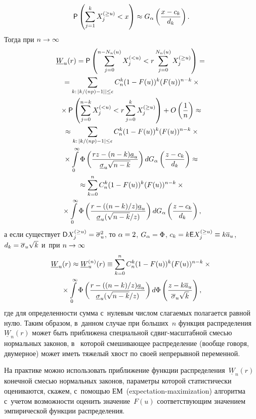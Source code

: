 \begin{multicols}{2}
\columnbreak

 \noindent
$$
{\sf P}\left(\sum\limits_{j=1}^{k}X_j^{(\ge u)}<x\right)
\approx G_{\alpha}\left(\displaystyle\frac{\displaystyle x-c_k\mathstrut}{\displaystyle d_k\mathstrut}\right).
$$
Тогда при $n\hm\to\infty$
\begin{multline}
\underline{W}_u(r)={\sf P}\left(\sum\limits_{j=0}^{n-N_n(u)}
X_j^{(<u)}<r\sum\limits_{j=0}^{N_n(u)}X_j^{(\ge u)}\right)={}
\\
{}=\sum\limits_{k:\,\left\vert
{k}/({np})-1\right\vert |\le\epsilon}
C_n^k(1-F(u))^k(F(u))^{n-k}\times{}\\
{}\times{\sf P}\left(
\sum\limits_{j=0}^{n-k}X_j^{(<u)}<r\sum\limits_{j=0}^{k}X_j^{(\ge u)}\right)+
O\left(\displaystyle\frac{\displaystyle 1\mathstrut}{\displaystyle n\mathstrut}\right)\approx{}
\\
{}\approx\sum\limits_{k:\,\left\vert {k}/({np})-1\right\vert
\le\epsilon} C_n^k(1-F(u))^k(F(u))^{n-k}\times{}\\
{}\times \int\limits_{0}^{\infty}
\Phi\left(\displaystyle\frac{\displaystyle rz-(n-k)\underline{a}_u\mathstrut}{\displaystyle \underline{\sigma}_u\sqrt{n-k}\mathstrut}\right)dG_{\alpha}
\left(\displaystyle\frac{\displaystyle z-c_k\mathstrut}{\displaystyle d_k\mathstrut}\right)\approx{}
\\
{}\approx\sum\limits_{k=0}^nC_n^k(1-F(u))^k(F(u))^{n-k}\times{}\\
{}\times
\int\limits_{0}^{\infty}\Phi\left(\displaystyle\frac{\displaystyle r-(({n-k})/{z}) \underline{a}_u\mathstrut}{\displaystyle \underline{\sigma}_u ({\sqrt{n-k}}/{z})\mathstrut}\right)dG_{\alpha}
\left(\displaystyle\frac{\displaystyle z-c_k\mathstrut}{\displaystyle d_k\mathstrut}\right),
\label{e6-kor}
\end{multline}
а если существует ${\sf D}X_j^{(\ge u)}\hm=\overline{\sigma}^2_u$, 
то $\alpha\hm=2$, $G_{\alpha}\hm=\Phi$, $c_k\hm=
k{\sf E}X_j^{(\ge u)}\hm\equiv k\overline{a}_u$, $d_k\hm=
\overline{\sigma}_u\sqrt{k}$ и~при $n\hm\to\infty$
\begin{multline}
\underline{W}_u(r)\approx \underline{W}_u^{(n)}(r)\equiv
\sum\limits_{k=0}^nC_n^k(1-F(u))^k(F(u))^{n-k}\times{}\\
{}\times \int\limits_{0}^{\infty}
\Phi\left(\displaystyle\frac{\displaystyle r-(({n-k})/{z})\underline{a}_u\mathstrut}{\displaystyle \underline{\sigma}_u ({\sqrt{n-k}}/{z})\mathstrut}\right)d\Phi
\left(\displaystyle\frac{\displaystyle z-k\overline{a}_u\mathstrut}{\displaystyle \overline{\sigma}_u\sqrt{k}\mathstrut}\right),
\label{e7-kor}
\end{multline}
где для определенности сумма с~нулевым числом слагаемых полагается 
равной нулю. Таким образом, в~данном случае при больших~$n$ 
функция распределения~$\underline{W}_n(r)$ может быть приближена 
специальной сдвиг-мас\-штаб\-ной смесью нормальных законов, в~ ко\-то\-рой 
смешивающее распределение (вообще говоря, двумерное) может иметь 
тяжелый хвост по своей непрерывной переменной.

На практике можно использовать приближение функции 
распределения~$\underline{W}_n(r)$ конечной смесью нормальных законов, 
параметры которой статистически оцениваются, скажем, с~по\-мощью 
ЕМ~(expectation-maximization) ал\-го\-рит\-ма с~учетом возможности оценить значение~$F(u)$ 
соответствующим значением эмпирической функции распределения.


\end{multicols}
